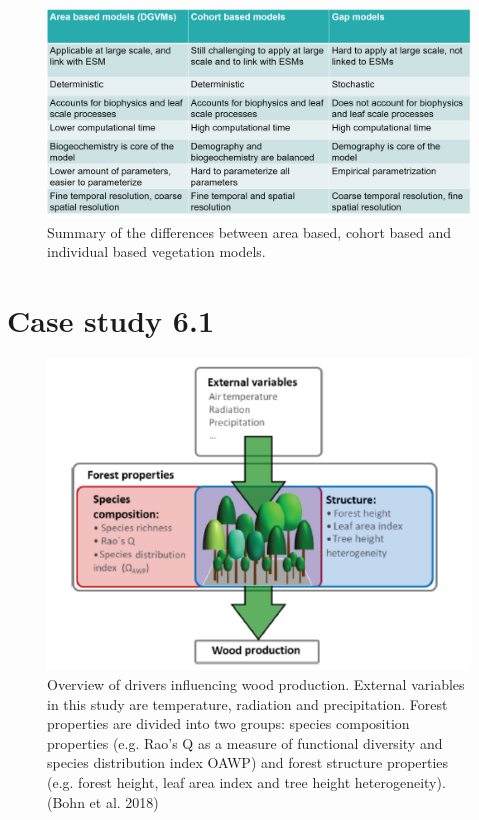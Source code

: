 \documentclass[
  12pt,
  oneside]{book}
\begin{document}
\begin{figure}

{\centering \includegraphics[width=0.8\linewidth]{figures/chap6/f634_table} 

}

\caption{Summary of the differences between area based, cohort based and individual based vegetation models.}\label{fig:f634}
\end{figure}

\hypertarget{case-study-6.1}{%
\section{Case study 6.1}\label{case-study-6.1}}

\begin{figure}

{\centering \includegraphics[width=0.8\linewidth]{figures/chap6/f635_bohn1} 

}

\caption{Overview of drivers influencing wood production. External variables in this study are temperature, radiation and precipitation. Forest properties are divided into two groups: species composition properties (e.g. Rao’s Q as a measure of functional diversity and species distribution index OAWP) and forest structure properties (e.g. forest height, leaf area index and tree height heterogeneity). (Bohn et al. 2018)}\label{fig:f635}
\end{figure}
\end{document}
